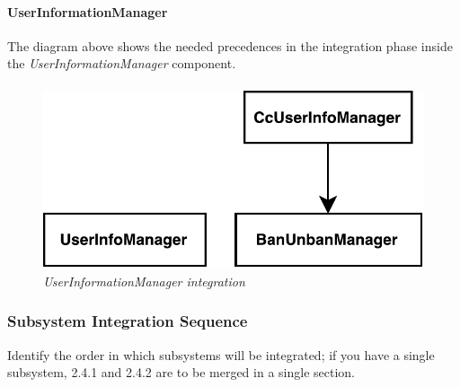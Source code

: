 \paragraph{UserInformationManager} 
The diagram above shows the needed precedences in the integration phase inside the \emph{UserInformationManager} component.
\paragraph{}

		\begin{figure}[h]
			\centering
			\includegraphics[width=0.6\linewidth]{img/userIntegration}
			\caption{
				\label{fig:userIntegration} 
				\emph{UserInformationManager integration}
			}
		\end{figure}

\subsubsection{Subsystem Integration Sequence}
Identify the order in which subsystems will be integrated; if you have a single subsystem, 2.4.1 and 2.4.2 are to be merged in a single section.
